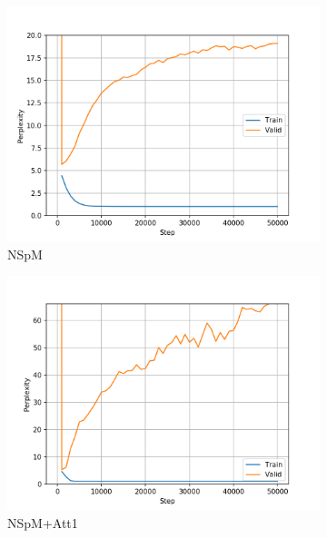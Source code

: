 \begin{figure}[h]
\centering
\begin{subfigure}{0.3\textwidth}
\includegraphics[width=\textwidth]{../results/lc-quad1/run1/neural_sparql_machine/ppls.png} 
\caption{NSpM}
\label{fig:lcquad nsm ppl}
\end{subfigure}
\hfill
\begin{subfigure}{0.3\textwidth}
\includegraphics[width=\textwidth]{../results/lc-quad1/run1/neural_sparql_machine_bahdanau_attention/ppls.png}
\caption{NSpM+Att1}
\label{fig:lcquad nsm-bah ppl}
\end{subfigure}
\hfill
\begin{subfigure}{0.3\textwidth}

\end{subfigure}
\end{figure}
